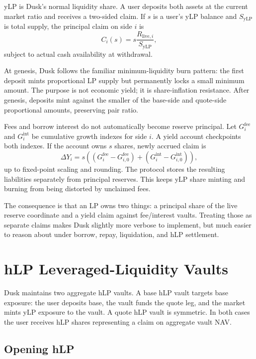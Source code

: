 \documentclass[11pt]{article}
\newcommand{\live}{\mathrm{live}}
\newcommand{\ylp}{\mathrm{yLP}}
\begin{document}
yLP is Dusk's normal liquidity share. A user deposits both assets at the current market ratio and receives a two-sided claim. If $s$ is a user's yLP balance and $S_{\ylp}$ is total supply, the principal claim on side $i$ is
\begin{equation}
C_i(s)=s\frac{R_{\live,i}}{S_{\ylp}},
\end{equation}
subject to actual cash availability at withdrawal.

At genesis, Dusk follows the familiar minimum-liquidity burn pattern: the first deposit mints proportional LP supply but permanently locks a small minimum amount. The purpose is not economic yield; it is share-inflation resistance. After genesis, deposits mint against the smaller of the base-side and quote-side proportional amounts, preserving pair ratio.

Fees and borrow interest do not automatically become reserve principal. Let $G_i^{\mathrm{fee}}$ and $G_i^{\mathrm{int}}$ be cumulative growth indexes for side $i$. A yield account checkpoints both indexes. If the account owns $s$ shares, newly accrued claim is
\begin{equation}
\Delta Y_i=s\left((G_i^{\mathrm{fee}}-G_{i,0}^{\mathrm{fee}})+(G_i^{\mathrm{int}}-G_{i,0}^{\mathrm{int}})\right),
\end{equation}
up to fixed-point scaling and rounding. The protocol stores the resulting liabilities separately from principal reserves. This keeps yLP share minting and burning from being distorted by unclaimed fees.

The consequence is that an LP owns two things: a principal share of the live reserve coordinate and a yield claim against fee/interest vaults. Treating those as separate claims makes Dusk slightly more verbose to implement, but much easier to reason about under borrow, repay, liquidation, and hLP settlement.

\section{hLP Leveraged-Liquidity Vaults}

Dusk maintains two aggregate hLP vaults. A base hLP vault targets base exposure: the user deposits base, the vault funds the quote leg, and the market mints yLP exposure to the vault. A quote hLP vault is symmetric. In both cases the user receives hLP shares representing a claim on aggregate vault NAV.

\subsection{Opening hLP}
\end{document}
